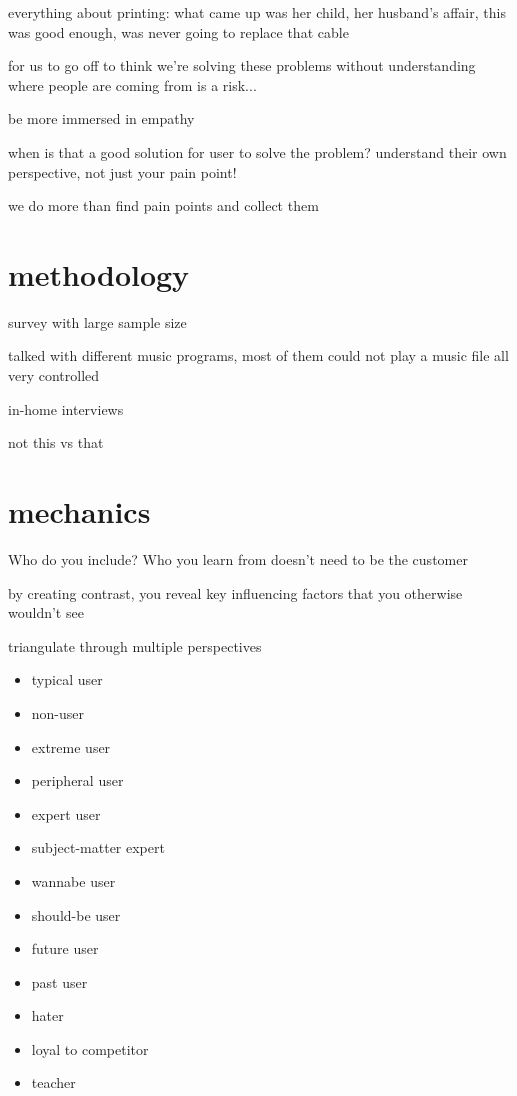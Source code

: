 \documentclass{article}
\begin{document}
everything about printing: what came up was her child, her husband's affair, this was good enough, was never going to replace that cable

for us to go off to think we're solving these problems without understanding where people are coming from is a risk...

be more immersed in empathy

when is that a good solution for user to solve the problem? understand their own perspective, not just your pain point!

we do more than find pain points and collect them

\section{methodology}

survey with large sample size

talked with different music programs, most of them could not play a music file
all very controlled

in-home interviews

not this vs that

\section{mechanics}
Who do you include?
Who you learn from doesn't need to be the customer

by creating contrast, you reveal key influencing factors that you otherwise wouldn't see

triangulate through multiple perspectives

\begin{itemize}
\item{typical user}
\item{non-user}
\item{extreme user}
\item{peripheral user}
\item{expert user}
\item{subject-matter expert}
\item{wannabe user}
\item{should-be user}
\item{future user}
\item{past user}
\item{hater}
\item{loyal to competitor}
\item{teacher}
\end{itemize}
\end{document}
